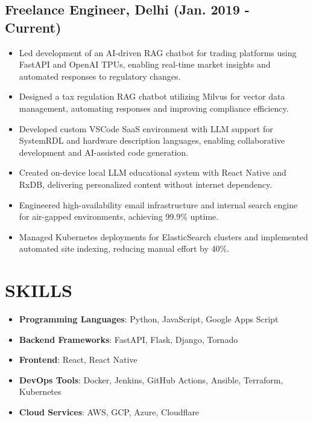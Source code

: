 \documentclass[a4paper,9pt]{article}
\begin{document}
\subsection*{Freelance Engineer, Delhi (Jan. 2019 - Current)}
\begin{itemize}
    \item Led development of an AI-driven RAG chatbot for trading platforms using FastAPI and OpenAI TPUs, enabling real-time market insights and automated responses to regulatory changes.
    \item Designed a tax regulation RAG chatbot utilizing Milvus for vector data management, automating responses and improving compliance efficiency.
    \item Developed custom VSCode SaaS environment with LLM support for SystemRDL and hardware description languages, enabling collaborative development and AI-assisted code generation.
    \item Created on-device local LLM educational system with React Native and RxDB, delivering personalized content without internet dependency.
    \item Engineered high-availability email infrastructure and internal search engine for air-gapped environments, achieving 99.9\% uptime.
    \item Managed Kubernetes deployments for ElasticSearch clusters and implemented automated site indexing, reducing manual effort by 40\%.
\end{itemize}

\section*{SKILLS}

\begin{multicols}{2}
\begin{itemize}[leftmargin=*]
    \item \textbf{Programming Languages}: Python, JavaScript, Google Apps Script
    \item \textbf{Backend Frameworks}: FastAPI, Flask, Django, Tornado
    \item \textbf{Frontend}: React, React Native
    \item \textbf{DevOps Tools}: Docker, Jenkins, GitHub Actions, Ansible, Terraform, Kubernetes
    \item \textbf{Cloud Services}: AWS, GCP, Azure, Cloudflare
\end{itemize}
\end{multicols}
\end{document}
